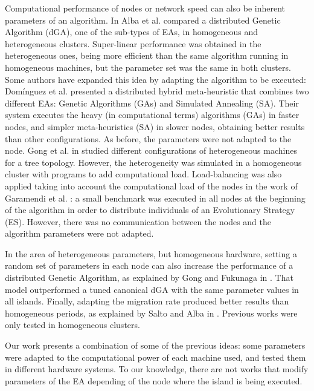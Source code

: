 \documentclass[final,1p,times]{elsarticle}
\begin{document}
 Computational performance of nodes or network speed can also be inherent parameters of an algorithm. In \cite{HETEROGENEOUSHARD} Alba et al. compared a distributed Genetic Algorithm (dGA), one of the sub-types of EAs, in homogeneous and heterogeneous clusters. Super-linear performance was obtained in the heterogeneous ones, being more efficient than the same algorithm running in homogeneous machines, but the parameter set was the same in both clusters. Some authors have expanded this idea by adapting the algorithm to be executed: Dom\'inguez et al. \cite{HYDROCM} presented a distributed hybrid meta-heuristic that combines two different EAs: Genetic Algorithms (GAs) and Simulated Annealing (SA). Their system executes the heavy (in computational terms) algorithms (GAs) in faster nodes, and simpler meta-heuristics (SA) in slower nodes, obtaining better results than other configurations. As before, the parameters were not adapted to the node. Gong et al. in \cite{HETEROGENEOUSTOPOLOGY} studied different configurations of heterogeneous machines for a tree topology. However, the heterogeneity was simulated in a homogeneous cluster with programs to add computational load. Load-balancing was also applied taking into account the computational load of the nodes in the work of Garamendi et al. \cite{PARALLELIMPLEMENTATION}: a small benchmark was executed in all nodes at the beginning of the algorithm in order to distribute individuals of an Evolutionary Strategy (ES). However, there was no communication between the nodes and the algorithm parameters were not adapted. 

In the area of heterogeneous parameters, but homogeneous hardware, setting a random set of parameters in each node can also increase the performance of a distributed Genetic Algorithm, as explained by Gong and Fukunaga in \cite{HETEROGENEOUSPARAMETERS}. That model outperformed a tuned canonical dGA with the same parameter values in all islands. Finally, adapting the migration rate produced better results than homogeneous periods, as explained by Salto and Alba in \cite{HETEROGENEOUSMIGRATION}. Previous works were only tested in homogeneous clusters.

 Our work presents a combination of some of the previous ideas: some parameters were adapted to the computational power of each machine used, and tested them in different hardware systems.
 To our knowledge, there are not works that
 modify parameters of the EA depending of the
 node where the island is being executed. 
\end{document}
